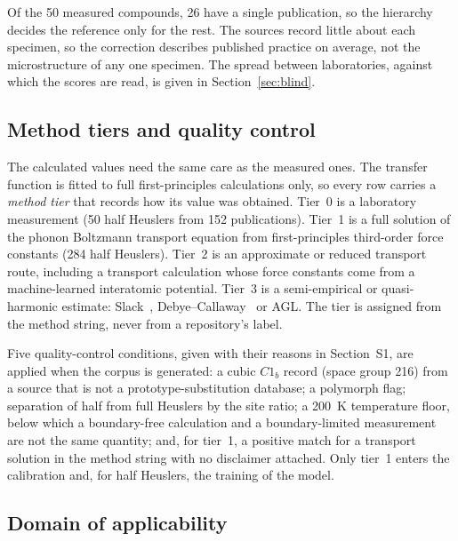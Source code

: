 Of the \num{50} measured compounds, \num{26} have a single publication, so the hierarchy decides the
reference only for the rest. The sources record little about each specimen, so the correction
describes published practice on average, not the microstructure of any one specimen. The spread
between laboratories, against which the scores are read, is given in Section~\ref{sec:blind}.

\subsection{Method tiers and quality control}
\label{sec:tiering}

The calculated values need the same care as the measured ones. The transfer function is fitted to
full first-principles calculations only, so every row carries a
\emph{method tier} that records how its value was obtained. Tier~0 is a laboratory measurement
(\num{50} half Heuslers from \num{152} publications). Tier~1 is a full solution of the phonon
Boltzmann transport equation from first-principles third-order force constants (\num{284} half
Heuslers). Tier~2 is an approximate or reduced transport route, including a transport calculation
whose force constants come from a machine-learned interatomic potential. Tier~3 is a semi-empirical
or quasi-harmonic estimate: Slack~\cite{slack1979the}, Debye--Callaway~\cite{callaway1959model} or
AGL. The tier is assigned from the method string, never from a repository's label.

Five quality-control conditions, given with their reasons in Section~S1, are applied when the corpus
is generated: a cubic $C1_b$ record (space group 216) from a source that is not a
prototype-substitution database; a polymorph flag; separation of half from full Heuslers by the site
ratio; a \SI{200}{\kelvin} temperature floor, below which a boundary-free calculation and a
boundary-limited measurement are not the same quantity; and, for tier~1, a positive match for a
transport solution in the method string with no disclaimer attached. Only tier~1 enters the
calibration and, for half Heuslers, the training of the model.

\subsection{Domain of applicability}
\label{sec:domain}

